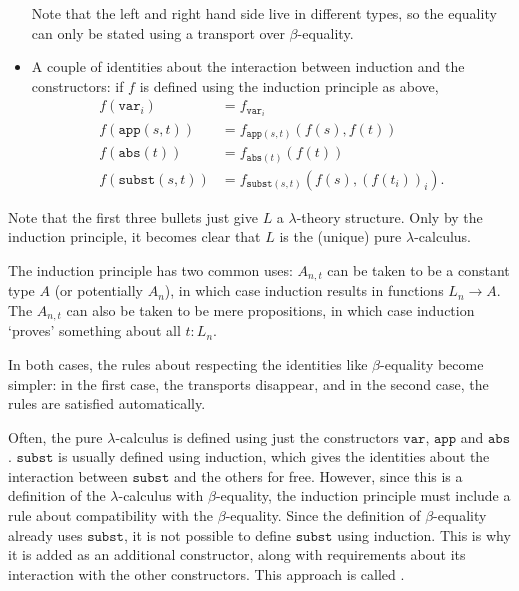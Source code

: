 \begin{itemize}
    Note that the left and right hand side live in different types, so the equality can only be stated using a transport over $ \beta $-equality.
  \item A couple of identities about the interaction between induction and the constructors: if $ f $ is defined using the induction principle as above,
  \begin{align*}
    f(\mathtt{var}_i) &= f_{\mathtt{var}_i}\\
    f(\mathtt{app}(s, t)) &= f_{\mathtt{app}(s, t)}(f(s), f(t))\\
    f(\mathtt{abs}(t)) &= f_{\mathtt{abs}(t)}(f(t))\\
    f(\mathtt{subst}(s, t)) &= f_{\mathtt{subst}(s, t)}(f(s), (f(t_i))_i).
  \end{align*}
\end{itemize}

\begin{remark}
  Note that the first three bullets just give $ L $ a $ \lambda $-theory structure. Only by the induction principle, it becomes clear that $ L $ is the (unique) pure $ \lambda $-calculus.
\end{remark}

\begin{remark}
  The induction principle has two common uses: $ A_{n, t} $ can be taken to be a constant type $ A $ (or potentially $ A_n $), in which case induction results in functions $ L_n \to A $. The $ A_{n, t} $ can also be taken to be mere propositions, in which case induction `proves' something about all $ t : L_n $.

  In both cases, the rules about respecting the identities like $ \beta $-equality become simpler: in the first case, the transports disappear, and in the second case, the rules are satisfied automatically.
\end{remark}

\begin{remark}
  Often, the pure $ \lambda $-calculus is defined using just the constructors $ \mathtt{var} $, $ \mathtt{app} $ and $ \mathtt{abs} $. $ \mathtt{subst} $ is usually defined using induction, which gives the identities about the interaction between $ \mathtt{subst} $ and the others for free. However, since this is a definition of the $ \lambda $-calculus with $ \beta $-equality, the induction principle must include a rule about compatibility with the $ \beta $-equality. Since the definition of $ \beta $-equality already uses $ \mathtt{subst} $, it is not possible to define $ \mathtt{subst} $ using induction. This is why it is added as an additional constructor, along with requirements about its interaction with the other constructors. This approach is called .
\end{remark}


